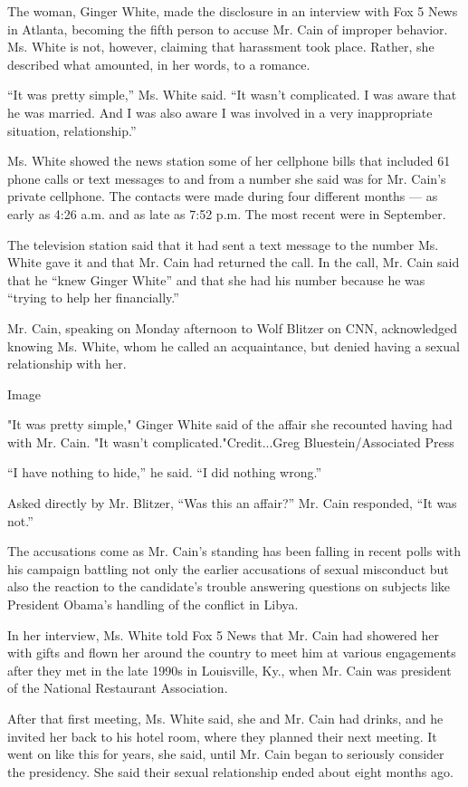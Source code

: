 The woman, Ginger White, made the disclosure in an interview with Fox 5
News in Atlanta, becoming the fifth person to accuse Mr. Cain of
improper behavior. Ms. White is not, however, claiming that harassment
took place. Rather, she described what amounted, in her words, to a
romance.

``It was pretty simple,'' Ms. White said. ``It wasn't complicated. I was
aware that he was married. And I was also aware I was involved in a very
inappropriate situation, relationship.''

Ms. White showed the news station some of her cellphone bills that
included 61 phone calls or text messages to and from a number she said
was for Mr. Cain's private cellphone. The contacts were made during four
different months --- as early as 4:26 a.m. and as late as 7:52 p.m. The
most recent were in September.

The television station said that it had sent a text message to the
number Ms. White gave it and that Mr. Cain had returned the call. In the
call, Mr. Cain said that he ``knew Ginger White'' and that she had his
number because he was ``trying to help her financially.''

Mr. Cain, speaking on Monday afternoon to Wolf Blitzer on CNN,
acknowledged knowing Ms. White, whom he called an acquaintance, but
denied having a sexual relationship with her.

Image

"It was pretty simple," Ginger White said of the affair she recounted
having had with Mr. Cain. "It wasn't complicated."Credit...Greg
Bluestein/Associated Press

``I have nothing to hide,'' he said. ``I did nothing wrong.''

Asked directly by Mr. Blitzer, ``Was this an affair?'' Mr. Cain
responded, ``It was not.''

The accusations come as Mr. Cain's standing has been falling in recent
polls with his campaign battling not only the earlier accusations of
sexual misconduct but also the reaction to the candidate's trouble
answering questions on subjects like President Obama's handling of the
conflict in Libya.

In her interview, Ms. White told Fox 5 News that Mr. Cain had showered
her with gifts and flown her around the country to meet him at various
engagements after they met in the late 1990s in Louisville, Ky., when
Mr. Cain was president of the National Restaurant Association.

After that first meeting, Ms. White said, she and Mr. Cain had drinks,
and he invited her back to his hotel room, where they planned their next
meeting. It went on like this for years, she said, until Mr. Cain began
to seriously consider the presidency. She said their sexual relationship
ended about eight months ago.

